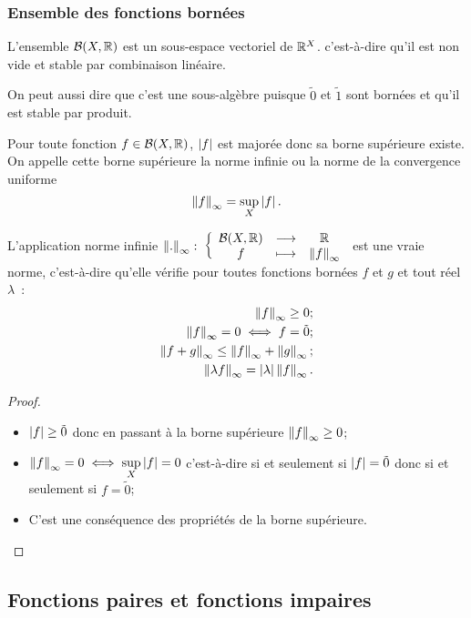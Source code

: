 \subsubsection{Ensemble des fonctions bornées}
\begin{theo}
  L'ensemble $\mathcal{B}(X,\mathbb{R})$ est un sous-espace vectoriel de $\mathbb{R}^X$. c'est-à-dire qu'il est non vide et stable par combinaison linéaire.
\end{theo}
On peut aussi dire que c'est une sous-algèbre puisque $\tilde{0}$ et $\tilde{1}$ sont bornées et qu'il est stable par produit.
\begin{defdef}
  Pour toute fonction $f \in \mathcal{B}(X,\mathbb{R})$, $\left\lvert f\right\rvert$ est majorée donc sa borne supérieure existe. On appelle cette borne supérieure la norme infinie ou la norme de la convergence uniforme
  \begin{equation}
    \left\lVert f\right\rVert_\infty=\sup\limits_{X}\left\lvert f\right\rvert.
  \end{equation}
\end{defdef}
\begin{theo}
  L'application norme infinie $\left\lVert{.}\right\rVert_\infty\colon \left\{\begin{array}{ccc} \mathcal{B}(X,\mathbb{R}) & \longrightarrow &\mathbb{R}\\ f & \longmapsto & \left\lVert f\right\rVert_\infty \end{array} \right.$ est une vraie norme, c'est-à-dire qu'elle vérifie pour toutes fonctions bornées $f$ et $g$ et tout réel $\lambda$~:
  \begin{align}
    \left\lVert f\right\rVert_\infty \geq 0; \\
    \left\lVert f\right\rVert_\infty = 0 \iff f=\tilde{0};\\
    \left\lVert f+g\right\rVert_\infty \leq \left\lVert f\right\rVert_\infty + \left\lVert g\right\rVert_\infty;\\
    \left\lVert\lambda f\right\rVert_\infty = \left\lvert\lambda\right\rvert \left\lVert f\right\rVert_\infty.
  \end{align}
\end{theo}
\begin{proof}
  \begin{itemize}
  \item $\left\lvert f\right\rvert \geq \tilde{0}$ donc en passant à la borne supérieure $\left\lVert f\right\rVert_\infty \geq 0$;
  \item $\left\lVert f\right\rVert_\infty = 0 \iff \sup\limits_{X}\left\lvert f\right\rvert=0$ c'est-à-dire si et seulement si $\left\lvert f\right\rvert=\tilde{0}$ donc si et seulement si $f=\tilde{0}$;
  \item C'est une conséquence des propriétés de la borne supérieure.
  \end{itemize}
\end{proof}

\subsection{Fonctions paires et fonctions impaires}

